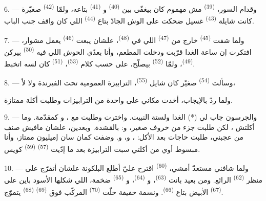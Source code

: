 \VUsaut{4.0mm}
\VUsaut{3.0mm}

6. --- وقدام السور،  \textsuperscript{(39)} مش مهموم كان بيغفّى بين
 \textsuperscript{(40)} و \textsuperscript{(41)}
بتاعه، ولمّا  \textsuperscript{(42)} صغيّرة كانت شايلة 
\textsuperscript{(43)} غسيل ضحكت على الوش الجادّ بتاع 
\textsuperscript{(44)} اللي كان واقف جنب الباب.

7. --- ولما شفت  \textsuperscript{(45)} خارج من 
\textsuperscript{(47)} اللي في  \textsuperscript{(48)}، علشان يبعت
 \textsuperscript{(46)} يعمل مشوار، افتكرت إن ساعة الغدا قرّبت
ودخلت المطعم، وأنا بعدّي الحوش اللي فيه  \textsuperscript{(50)} بيركن
 \textsuperscript{(49)}، ولمّا  \textsuperscript{(52)}
بيصلّح، على حسب كلام  \textsuperscript{(53)}،  \textsuperscript{(51)} كان لسه اتخبط.

8. --- وسألت  \textsuperscript{(54)} صغيّر كان شايل 
\textsuperscript{(55)}، الترابيزة العمومية تحت الفيرندة ولا لأ،


ولما ردّ بالإيجاب، أخدت مكاني على واحدة من الترابيزات وطلبت أكلة ممتازة.

\VUsaut{4.0mm}
\VUsaut{3.0mm}

9. --- والجرسون جاب لي  (*) الغدا ولستة النبيت. واخترت وطلبت
 مع  ، و
كمقدّمة. وما أكلتش ، لكن طلبت جزء من  خروف صغير،
و:  بالقشدة. وبعدين، علشان مافيش صنف من
 عجبني، طلبت حاجات بعد الأكل: ، و،
و. وضفت كمان  سان إميليون ممتاز، وأنا مبسوط أوي من
أكلتي سبت الترابيزة بعد ما إدّيت  \textsuperscript{(57)}
 \textsuperscript{(59)} كويس.

10. --- ولما شافني مستعدّ أمشي،  \textsuperscript{(60)} اقترح عليّ
أطلع البلكونة علشان أتفرّج على منظر  \textsuperscript{(62)} الرائع.
ومن بعيد بانت  \textsuperscript{(63)}، و
\textsuperscript{(64)}، و \textsuperscript{(65)} ضخمة، اللي شكلها الأسود
باين على  \textsuperscript{(67)} الأبيض بتاع 
\textsuperscript{(66)}. ونسمة خفيفة خلّت  \textsuperscript{(70)} المركّب
فوق  \textsuperscript{(69)}  \textsuperscript{(68)} يتموّج.


